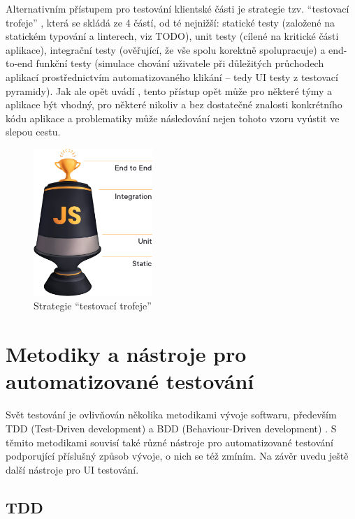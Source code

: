 Alternativním přístupem pro testování klientské části je strategie tzv. \enquote{testovací trofeje} \cite{test-trophy}, která se skládá ze 4 částí, od té nejnižší: statické testy (založené na statickém typování a linterech, viz TODO), unit testy (cílené na kritické části aplikace), integrační testy (ověřující, že vše spolu korektně spolupracuje) a end-to-end funkční testy (simulace chování uživatele při důležitých průchodech aplikací prostřednictvím automatizovaného klikání -- tedy UI testy z testovací pyramidy). Jak ale opět uvádí \cite{test-roth}, tento přístup opět může pro některé týmy a aplikace být vhodný, pro některé nikoliv a bez dostatečné znalosti konkrétního kódu aplikace a problematiky může následování nejen tohoto vzoru vyústit ve slepou cestu.

\begin{figure}[h]\centering
	\includegraphics[width=0.4\textwidth]{img/ext/testing_trophy.png}
	\caption[Strategie \enquote{testovací trofeje}]{Strategie \enquote{testovací trofeje} \cite{test-trophy}}\label{fig:testing_trophy}
\end{figure}

\section{Metodiky a nástroje pro automatizované testování}

Svět testování je ovlivňován několika metodikami vývoje softwaru, především TDD (Test-Driven development) a BDD (Behaviour-Driven development) \cite{test-swtestinghelp1}. S těmito metodikami souvisí také různé nástroje pro automatizované testování podporující příslušný způsob vývoje, o nich se též zmíním. Na závěr uvedu ještě další nástroje pro UI testování.

\subsection{TDD}


